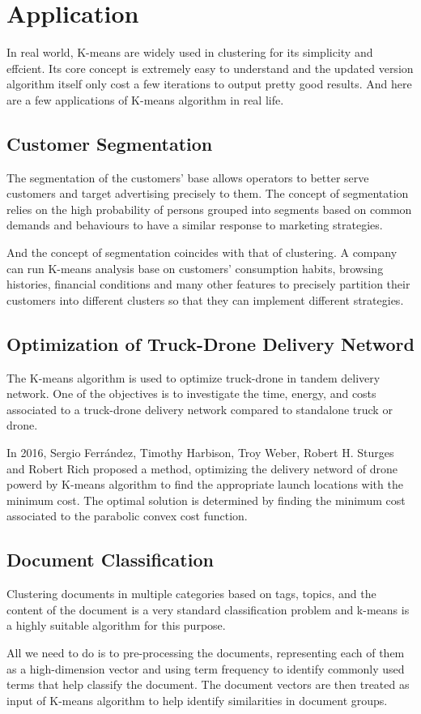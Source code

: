 \documentclass[11pt]{article}
\begin{document}
\section{Application}
In real world, K-means are widely used in clustering for its simplicity and effcient. Its core concept is extremely easy to understand and the updated version algorithm itself only cost a few iterations to output pretty good results. And here are a few applications of K-means algorithm in real life.
\subsection{Customer Segmentation}
The segmentation of the customers’ base allows operators to better serve customers and target advertising precisely to them\cite{Bcil2012PrepaidTC}.
The concept of segmentation relies on the high probability of persons grouped into segments based on common demands and behaviours to have a similar response to marketing strategies.
\par And the concept of segmentation coincides with that of clustering. A company can run K-means analysis base on customers' consumption habits, browsing histories, financial conditions and many other features to precisely partition their customers into different clusters so that they can implement different strategies.\cite{Bcil2012PrepaidTC}
\subsection{Optimization of Truck-Drone Delivery Netword}
The K-means algorithm is used to optimize truck-drone in tandem delivery network. One of the objectives is to investigate the time, energy, and costs associated to a truck-drone delivery network compared to standalone truck or drone. 
\par In 2016, Sergio Ferr{\'a}ndez, Timothy Harbison, Troy Weber, Robert H. Sturges and Robert Rich proposed a method\cite{Ferrndez2016OptimizationOA}, optimizing the delivery netword of drone powerd by K-means algorithm to find the appropriate launch locations with the  minimum cost.  The optimal solution is determined by finding the minimum cost associated to the parabolic convex cost function.
\subsection{Document Classification}
Clustering documents in multiple categories based on tags, topics, and the content of the document is a very standard classification problem and k-means is a highly suitable algorithm for this purpose.\cite{kmeansapplication}
\par All we need to do is to pre-processing the documents, representing each of them as a high-dimension vector and using term frequency to identify commonly used terms that help classify the document.
The document vectors are then treated as input of K-means algorithm to help identify similarities in document groups.\cite{Jacob2016ImprovedCO}
\end{document}
